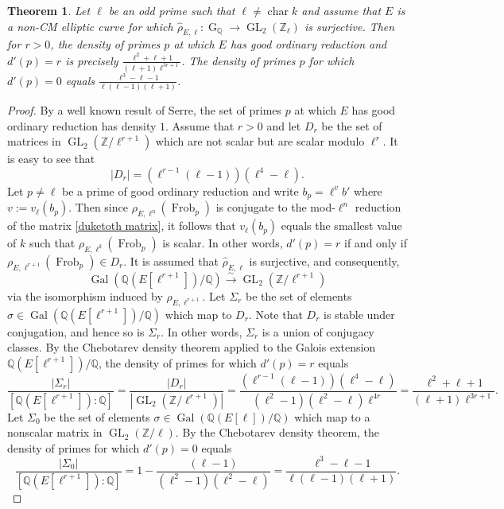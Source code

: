 \documentclass[table]{amsart}
\newtheorem{theorem}{Theorem}[section]
\newcommand{\Z}{\mathbb{Z}}
\newcommand{\Q}{\mathbb{Q}}
\newcommand{\op}[1]{\operatorname{#1}}
\numberwithin{equation}{section}
\begin{document}
\begin{theorem}\label{section 3 thm 2}
    Let $\ell$ be an odd prime such that $\ell\neq \op{char}k$ and assume that $E$ is a non-CM elliptic curve for which $\widehat{\rho}_{E, \ell}:\op{G}_{\Q}\rightarrow \op{GL}_2(\Z_\ell)$ is surjective. Then for $r>0$, the density of primes $p$ at which $E$ has good ordinary reduction and $d'(p)=r$ is precisely $\frac{\ell^2+\ell+1}{(\ell+1)\ell^{3r+1}}$. The density of primes $p$ for which $d'(p)=0$ equals $\frac{\ell^3-\ell-1}{\ell(\ell-1)(\ell+1)}$.
\end{theorem}
\begin{proof}
    By a well known result of Serre, the set of primes $p$ at which $E$ has good ordinary reduction has density $1$. Assume that $r>0$ and let $D_{r}$ be the set of matrices in $\op{GL}_2(\Z/\ell^{r+1})$ which are not scalar but are scalar modulo $\ell^r$. It is easy to see that 
    \[|D_r|=(\ell^{r-1}(\ell-1))(\ell^4-\ell).\]
    Let $p\neq \ell$ be a prime of good ordinary reduction and write $b_p=\ell^v b'$ where $v:=v_\ell(b_p)$. Then since $\rho_{E,\ell^n}(\op{Frob}_p)$ is conjugate to the mod-$\ell^n$ reduction of the matrix \eqref{duketoth matrix}, it follows that $v_\ell(b_p)$ equals the smallest value of $k$ such that $\rho_{E, \ell^k}(\op{Frob}_p)$ is scalar. In other words, $d'(p)=r$ if and only if $\rho_{E,\ell^{r+1}}(\op{Frob}_p)\in D_{r}$. It is assumed that $\widehat{\rho}_{E, \ell}$ is surjective, and consequently, 
    \[\op{Gal}(\Q(E[\ell^{r+1}])/\Q)\xrightarrow{\sim} \op{GL}_2(\Z/\ell^{r+1})\] via the isomorphism induced by $\rho_{E, \ell^{r+1}}$. Let $\Sigma_r$ be the set of elements $\sigma\in \op{Gal}(\Q(E[\ell^{r+1}])/\Q)$ which map to $D_r$. Note that $D_r$ is stable under conjugation, and hence so is $\Sigma_r$. In other words, $\Sigma_r$ is a union of conjugacy classes. By the Chebotarev density theorem applied to the Galois extension $\Q(E[\ell^{r+1}])/\Q$, the density of primes for which $d'(p)=r$ equals
    \[\frac{|\Sigma_{r}|}{[\Q(E[\ell^{r+1}]):\Q]}=\frac{|D_{r}|}{|\op{GL}_2(\Z/\ell^{r+1})|}=\frac{(\ell^{r-1}(\ell-1))(\ell^4-\ell)}{(\ell^2-1)(\ell^2-\ell)\ell^{4r}}=
\frac{\ell^2+\ell+1}{(\ell+1)\ell^{3r+1}}.
\]
Let $\Sigma_0$ be the set of elements $\sigma\in \op{Gal}(\Q(E[\ell])/\Q)$ which map to a nonscalar matrix in $\op{GL}_2(\Z/\ell)$. By the Chebotarev density theorem, the density of primes for which $d'(p)=0$ equals
 \[\frac{|\Sigma_{0}|}{[\Q(E[\ell^{r+1}]):\Q]}=1-\frac{(\ell-1)}{(\ell^2-1)(\ell^2-\ell)}=\frac{\ell^3-\ell-1}{\ell(\ell-1)(\ell+1)}.\]
\end{proof}
\end{document}
